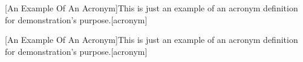 

[An Example Of An Acronym]{This is just an example of an acronym definition for demonstration's purpose.}[acronym]

[An Example Of An Acronym]{This is just an example of an acronym definition for demonstration's purpose.}[acronym]
